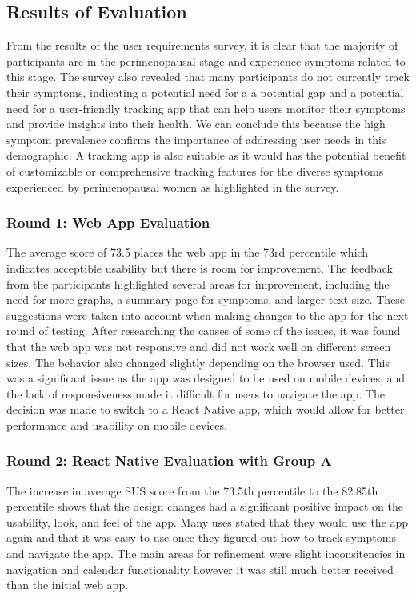 \subsection{Results of Evaluation}

From the results of the user requirements survey, it is clear that the majority of participants are in the perimenopausal stage and experience symptoms related to this stage. The survey also revealed that many participants do not currently track their symptoms, indicating a potential need for a a potential gap and a potential need for a user-friendly tracking app that can help users monitor their symptoms and provide insights into their health. We can conclude this because the high symptom prevalence confirms the importance of addressing user needs in this demographic. A tracking app is also suitable as it would has the potential benefit of customizable or comprehensive tracking features for the diverse symptoms experienced by perimenopausal women as highlighted in the survey. 

\subsubsection{Round 1: Web App Evaluation}
The average score of 73.5 places the web app in the 73rd percentile which indicates acceptible usability but there is room for improvement. The feedback from the participants highlighted several areas for improvement, including the need for more graphs, a summary page for symptoms, and larger text size. These suggestions were taken into account when making changes to the app for the next round of testing. After researching the causes of some of the issues, it was found that the web app was not responsive and did not work well on different screen sizes. The behavior also changed slightly depending on the browser used. This was a significant issue as the app was designed to be used on mobile devices, and the lack of responsiveness made it difficult for users to navigate the app. The decision was made to switch to a React Native app, which would allow for better performance and usability on mobile devices.

\subsubsection{Round 2: React Native Evaluation with Group A}
The increase in average SUS score from the 73.5th percentile to the 82.85th percentile shows that the design changes had a significant positive impact on the usability, look, and feel of the app. Many uses stated that they would use the app again and that it was easy to use once they figured out how to track symptoms and navigate the app. The main areas for refinement were slight inconsitencies in navigation and calendar functionality however it was still much better received than the initial web app. 

